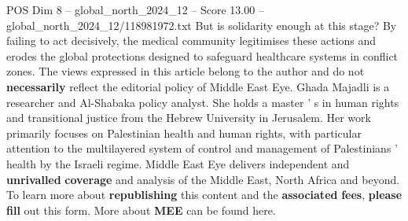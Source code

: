 \begin{textsample}{POS Dim 8 – global\_north\_2024\_12 – Score 13.00 – global\_north\_2024\_12/118981972.txt}
But is solidarity enough at this stage?
By failing to act decisively, the medical community legitimises these actions and erodes the global protections designed to safeguard healthcare systems in conflict zones.
The views expressed in this article belong to the author and do not \textbf{necessarily} reflect the editorial policy of Middle East Eye.
Ghada Majadli is a researcher and Al-Shabaka policy analyst.
She holds a master ' s in human rights and transitional justice from the Hebrew University in Jerusalem.
Her work primarily focuses on Palestinian health and human rights, with particular attention to the multilayered system of control and management of Palestinians ' health by the Israeli regime.
Middle East Eye delivers independent and \textbf{unrivalled} \textbf{coverage} and analysis of the Middle East, North Africa and beyond.
To learn more about \textbf{republishing} this content and the \textbf{associated} \textbf{fees}, \textbf{please} \textbf{fill} out this form.
More about \textbf{MEE} can be found here.

\end{textsample}
